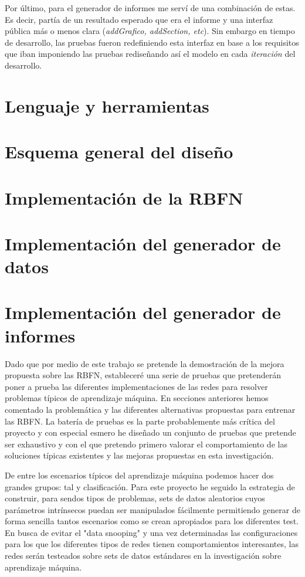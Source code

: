 \documentclass[10pt,a4paper]{report}
\begin{document}
Por último, para el generador de informes me serví de una combinación de estas. Es decir, partía de un resultado esperado que era el informe y una interfaz pública más o menos clara (\textit{addGrafico, addSection, etc}). Sin embargo en tiempo de desarrollo, las pruebas fueron redefiniendo esta interfaz en base a los requisitos que iban imponiendo las pruebas rediseñando así el modelo en cada \textit{iteración} del desarrollo.

\section{Lenguaje y herramientas}
\section{Esquema general del diseño}
\section{Implementación de la RBFN}
\section{Implementación del generador de datos}
\section{Implementación del generador de informes}

Dado que por medio de este trabajo se pretende la demostración de la mejora propuesta sobre las RBFN, estableceré una serie de pruebas que pretenderán poner a prueba las diferentes implementaciones de las redes para resolver problemas típicos de aprendizaje máquina.
En secciones anteriores hemos comentado la problemática y las diferentes alternativas propuestas para entrenar las RBFN. La batería de pruebas es la parte probablemente más crítica del proyecto y con especial esmero he diseñado un conjunto de pruebas que pretende ser exhaustivo y con el que pretendo primero valorar el comportamiento de las soluciones típicas existentes y las mejoras propuestas en esta investigación.

De entre los escenarios típicos del aprendizaje máquina podemos hacer dos grandes grupos: tal y clasificación. Para este proyecto he seguido la estrategia de construir, para sendos tipos de problemas, sets de datos aleatorios cuyos parámetros intrínsecos puedan ser manipulados fácilmente permitiendo generar de forma sencilla tantos escenarios como se crean apropiados para los diferentes test. En busca de evitar el "data snooping" y una vez determinadas las configuraciones para los que los diferentes tipos de redes tienen comportamientos interesantes, las redes serán testeados sobre sets de datos estándares en la investigación sobre aprendizaje máquina.
\end{document}
